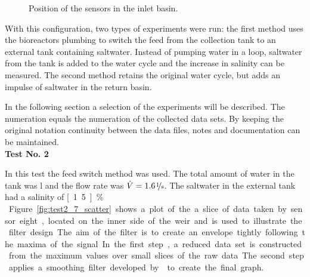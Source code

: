 \begin{figure}[H]
\begin{center}
		\caption{Position of the sensors in the inlet basin. \parencite{ts}}
		\label{fig:senspos}
	\end{center}
\end{figure}

With this configuration, two types of experiments were run: the first method uses the bioreactors plumbing to switch the feed from the collection tank to an external tank containing saltwater. Instead of pumping water in a loop, saltwater from the tank is added to the water cycle and the increase in salinity can be measured. The second method retains the original water cycle, but adds an impulse of saltwater in the return basin.

In the following section a selection of the experiments will be described. The numeration equals the numeration of the collected data sets. By keeping the original notation continuity between the data files, notes and documentation can be maintained.\\

\textbf{Test No. 2}

In this test the feed switch method was used. The total amount of water in the tank was \unit[65]{l} and the flow rate was $\dot{V} =  \unitfrac[1.6]{l}{s}$. The saltwater in the external tank had a salinity of \unit[1.5]{\%}.\\

Figure \ref{fig:test2_7_scatter} shows a plot of the a slice of data taken by sensor eight, located on the inner side of the weir and is used to illustrate the filter design. The aim of the filter is to create an envelope tightly following the maxima of the signal. In the first step, a reduced data set is constructed from the maximum values over small slices of the raw data. The second step applies a smoothing filter developed by \textcite{savitzky1964smoothing} to create the final graph.

